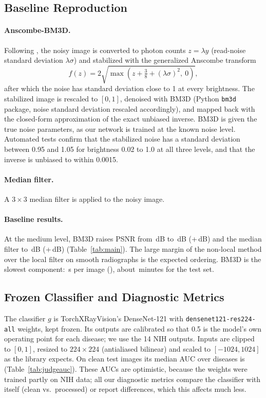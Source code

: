 \documentclass[11pt]{article}
\begin{document}
\subsection{Baseline Reproduction}
\label{sec:baselines}
\paragraph{Anscombe-BM3D.} Following \citet{makitalo2013gat}, the noisy image is converted to photon counts $z=\lambda y$ (read-noise standard deviation $\lambda\sigma$) and stabilized with the generalized Anscombe transform
\begin{equation}
  f(z) = 2\sqrt{\max\!\left(z + \tfrac{3}{8} + (\lambda\sigma)^2,\ 0\right)},
\end{equation}
after which the noise has standard deviation close to 1 at every brightness. The stabilized image is rescaled to $[0,1]$, denoised with BM3D \citep{dabov2007bm3d} (Python \texttt{bm3d} package, noise standard deviation rescaled accordingly), and mapped back with the closed-form approximation of the exact unbiased inverse. BM3D is given the true noise parameters, as our network is trained at the known noise level. Automated tests confirm that the stabilized noise has a standard deviation between 0.95 and 1.05 for brightness 0.02 to 1.0 at all three levels, and that the inverse is unbiased to within 0.0015.

\paragraph{Median filter.} A $3\times3$ median filter is applied to the noisy image.

\paragraph{Baseline results.} At the medium level, BM3D raises PSNR from \NoisyPSNR\,dB to \BMPSNR\,dB (+\BMGain\,dB) and the median filter to \MedianPSNR\,dB (+\MedianGain\,dB) (Table~\ref{tab:main}). The large margin of the non-local method over the local filter on smooth radiographs is the expected ordering. BM3D is the slowest component: \BMSec\,s per image (\BMHardware), about \BMMinutes\,minutes for the test set.

\subsection{Frozen Classifier and Diagnostic Metrics}
\label{sec:judge}
The classifier $g$ is TorchXRayVision's DenseNet-121 \citep{huang2017densenet,cohen2022torchxrayvision} with \texttt{densenet121-res224-all} weights, kept frozen. Its outputs are calibrated so that 0.5 is the model's own operating point for each disease; we use the 14 NIH outputs. Inputs are clipped to $[0,1]$, resized to $224\times224$ (antialiased bilinear) and scaled to $[-1024,1024]$ as the library expects. On clean test images its median AUC over diseases is \JudgeMedianAUC{} (Table~\ref{tab:judgeauc}). These AUCs are optimistic, because the weights were trained partly on NIH data; all our diagnostic metrics compare the classifier with itself (clean vs.\ processed) or report differences, which this affects much less.
\end{document}
